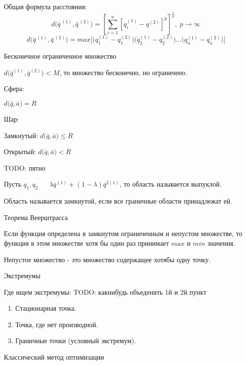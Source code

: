 \documentclass[12pt,a5paper]{scrbook}
\begin{document}
  \par
  Общая формула расстояния:
  $$
  	d
      \Big(
        \bar{q}^{\,\left(1\right)}, \bar{q}^{\,\left(2\right)}
      \Big)
      =
      \left[
        \sum_{i = 1}^{n}
        \left[
          q^{(1)}_{i} - q^{(2)}
        \right]^p
      \right]^{\frac{1}{p}},\; p \to \infty
  $$
  $$
  	d
      \Big(
        \bar{q}^{\,\left(1\right)}, \bar{q}^{\,\left(2\right)}
      \Big)
      = max
      \bigg[
        \Big(
          q_1^{(1)} - q_1^{(2)}
        \Big)
        \Big(
          q_2^{(1)} - q_2^{(2)}
        \Big)
        \ldots
        \Big(
          q_n^{(1)} - q_n^{(2)}
        \Big)
      \bigg]
  $$
  \par
  Бесконечное ограниченное множество
  \par
  $d\big(\bar{q}^{(1)}, \bar{q}^{(2)}\big) < M$, то множество бесконечно, но ограничено.
  \par
  Сфера:
  \par
  $d\big(\bar{q}, \bar{a}\big) = R$
  \par
  Шар:
  \par
  Замкнутый: $d\big(\bar{q}, \bar{a}\big) \leq R$
  \par
  Открытый: $d\big(\bar{q}, \bar{a}\big) < R$
  \par
  TODO: пятно
  \par
  Пусть $q_1, q_2\hspace{20pt} \lambda\bar{q}^{(1)} + (1 - \lambda)\bar{q}^{2(1)}$, то область называется выпуклой.
  \par
  Область называется замкнутой, если все граничные области принадлежат ей.
  \par
  Теорема Веерштрасса
  \par
  Если функция определена в замкнутом ограниченным и непустом множестве, то функция в этом множестве хотя бы один раз принимает $max$ и $min$ значения.
  \par
  Непустое множество - это множество содержащее хотябы одну точку.
  \par
  Экстремумы
  \par
  Где ищем экстремумы:
  TODO: какнибудь объеденить 1й и 2й пункт
  \begin{enumerate}
  	\item Стационарная точка.
  	\item Точка, где нет производной.
  	\item Граничные точки (условный экстремум).
  \end{enumerate}
  Классический метод оптимизации
  \par
\end{document}

